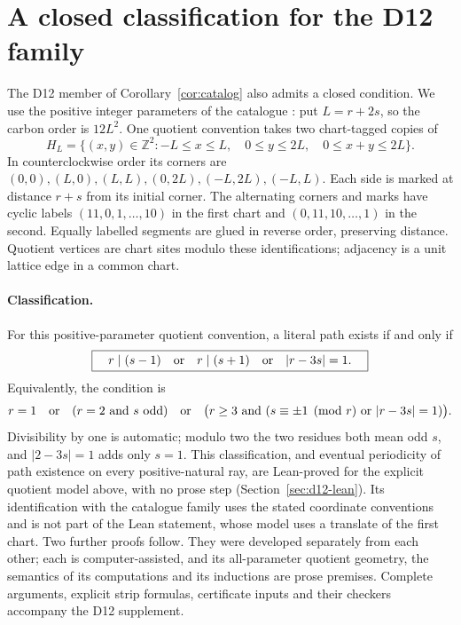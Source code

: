 \documentclass[11pt]{amsart}
\newcommand{\Z}{\mathbb Z}
\newcommand{\record}[1]{\nolinkurl{#1}}
\newcommand{\claimid}[1]{\par\nopagebreak\noindent\textit{Machine-readable claim:} \record{#1}.\par}
\theoremstyle{definition}\newtheorem{definition}{Definition}
\begin{document}
\section{A closed classification for the D12 family}\label{sec:d12-classification}
The D12 member of Corollary~\ref{cor:catalog} also admits a closed
condition. We use the positive integer parameters of the catalogue
\cite{Graver}: put $L=r+2s$, so the carbon order is $12L^2$.
One quotient convention takes two chart-tagged copies of
\[
 H_L=\{(x,y)\in\Z^2:-L\le x\le L,\quad 0\le y\le2L,
                            \quad0\le x+y\le2L\}.
\]
In counterclockwise order its corners are
$(0,0),(L,0),(L,L),(0,2L),(-L,2L),(-L,L)$.
Each side is marked at distance $r+s$ from its initial corner.
The alternating corners and marks have cyclic labels
$(11,0,1,\ldots,10)$ in the first chart and
$(0,11,10,\ldots,1)$ in the second. Equally labelled segments
are glued in reverse order, preserving distance. Quotient vertices
are chart sites modulo these identifications; adjacency is a unit
lattice edge in a common chart.

\paragraph{Classification.}\label{thm:d12-classification}
For this positive-parameter quotient convention, a literal path exists
if and only if
\[
 \boxed{\quad r\mid(s-1)\quad\hbox{or}\quad r\mid(s+1)
                     \quad\hbox{or}\quad |r-3s|=1.\quad}
\]
Equivalently, the condition is
\[
 r=1\quad\hbox{or}\quad(r=2\ \hbox{and }s\hbox{ odd})\quad\hbox{or}\quad
 \bigl(r\ge3\ \hbox{and }(s\equiv\pm1\pmod r\ \hbox{or }|r-3s|=1)\bigr).
\]
Divisibility by one is automatic; modulo two the two residues both
mean odd $s$, and $|2-3s|=1$ adds only $s=1$.
This classification, and eventual periodicity of path existence on
every positive-natural ray, are Lean-proved for the explicit quotient
model above, with no prose step (Section~\ref{sec:d12-lean}). Its
identification with the catalogue family uses the stated coordinate
conventions and is not part of the Lean statement, whose model uses a
translate of the first chart. Two further proofs follow. They were developed
separately from each other; each is computer-assisted, and its
all-parameter quotient geometry, the semantics of its computations
and its inductions are prose premises. Complete arguments, explicit
strip formulas, certificate inputs and their checkers accompany the
D12 supplement.
\end{document}
